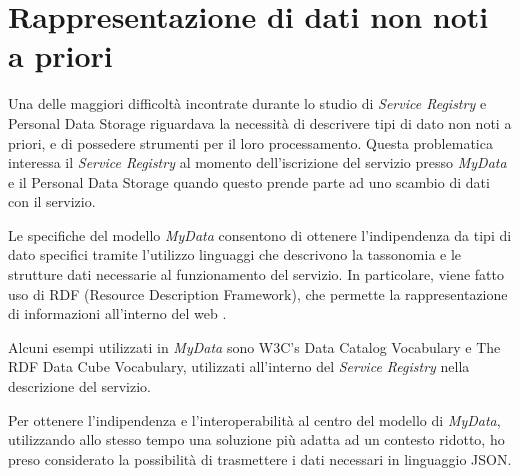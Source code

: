 \section{Rappresentazione di dati non noti a priori}
\label{sec:A-datinonnotiapriori}
Una delle maggiori difficolt\`a incontrate durante lo studio di \textit{Service Registry} e Personal Data Storage riguardava la necessit\`a di descrivere tipi di dato non noti a priori, e di possedere strumenti per il loro processamento. Questa problematica interessa il \textit{Service Registry} al momento dell’iscrizione del servizio presso \textit{MyData} e il Personal Data Storage quando questo prende parte ad uno scambio di dati con il servizio.

Le specifiche del modello \textit{MyData} consentono di ottenere l’indipendenza da tipi di dato specifici tramite l’utilizzo linguaggi che descrivono la tassonomia e le strutture dati necessarie al funzionamento del servizio. In particolare, viene fatto uso di RDF (Resource Description Framework), che permette la rappresentazione di informazioni all’interno del web \cite{w3crdf}.

Alcuni esempi utilizzati in \textit{MyData} sono W3C’s Data Catalog Vocabulary\cite{w3cdatacatalog} e The RDF Data Cube Vocabulary\cite{w3cdatacube}, utilizzati all’interno del \textit{Service Registry} nella descrizione del servizio.

Per ottenere l’indipendenza e l’interoperabilit\`a al centro del modello di \textit{MyData}, utilizzando allo stesso tempo una soluzione pi\`u adatta ad un contesto ridotto, ho preso considerato la possibilit\`a di trasmettere i dati necessari in linguaggio JSON.



